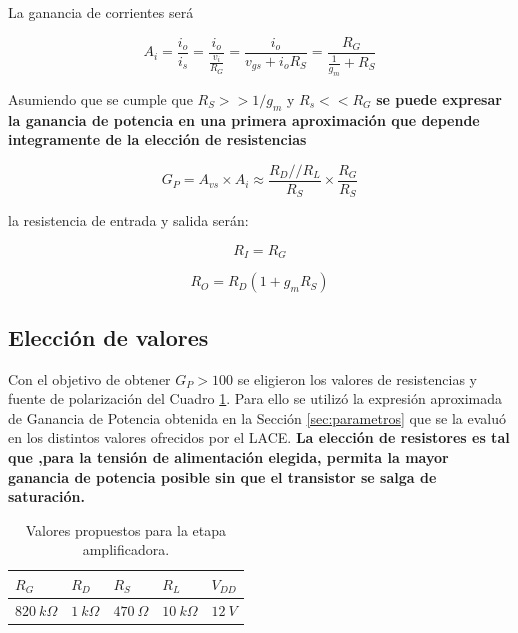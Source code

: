 \documentclass[a4paper, 10pt, spanish]{article}
\begin{document}
La ganancia de corrientes será

\begin{equation}
A_i = \frac{i_o}{i_s} = \frac{i_o}{\frac{v_i}{R_G}} = \frac{i_o}{v_{gs}+i_o R_S} = \frac{R_G}{\frac{1}{g_m}+R_S}
\end{equation}

Asumiendo que se cumple que $R_S >> 1/g_m$ y $R_s << R_G$ \textbf{se puede expresar la ganancia de potencia en una primera aproximación que depende integramente de la elección de resistencias}

\begin{equation}
G_P = A_{vs}\times A_i \approx \frac{R_D//R_L}{R_S} \times \frac{R_G}{R_S}
\end{equation}


la resistencia de entrada y salida serán:

\begin{equation}
R_I = R_G
\end{equation}

\begin{equation}
R_O = R_D(1+g_mR_S)
\end{equation}


\subsection{Elección de valores}\label{sec:valores}

Con el objetivo de obtener $G_P > 100$ se eligieron los valores de resistencias y fuente de polarización del Cuadro \ref{tab:valores}. Para ello se utilizó la expresión aproximada de Ganancia de Potencia obtenida en la Sección \ref{sec:parametros} que se la evaluó en los distintos valores ofrecidos por el LACE. \textbf{La elección de resistores es tal que ,para la tensión de alimentación elegida, permita la mayor ganancia de potencia posible sin que el transistor se salga de saturación.}

\begin{table}[h]
\centering
\begin{tabularx}{0.7\textwidth}{XXXXX}
\hline
 $R_G$  		& $R_D$ 		& $R_S$ 			& $R_L$ 		& $V_{DD}$ \\
 \hline
 $820\ k\Omega$ & $1\ k\Omega$ 	& $470\ \Omega$ 	& $10\ k\Omega$ & $12\ V$ \\
\hline
\end{tabularx}
\caption{Valores propuestos para la etapa amplificadora.}
\label{tab:valores}
\end{table}
\end{document}
